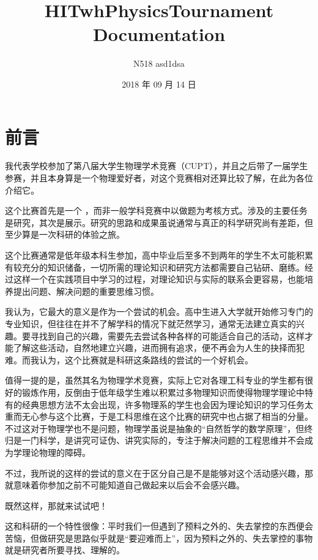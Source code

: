 \documentclass[a4paper,10pt,english]{sphinxmanual}
\title{HITwhPhysicsTournament Documentation}
\date{2018 年 09 月 14 日}
\author{N518 asd1dsa}
\begin{document}
\maketitle
\sphinxtableofcontents
{}\label{\detokenize{index::doc}}



\chapter{前言}
\label{\detokenize{Preface::doc}}\label{\detokenize{Preface:id1}}
我代表学校参加了第八届大学生物理学术竞赛（CUPT），并且之后带了一届学生参赛，并且本身算是一个物理爱好者，对这个竞赛相对还算比较了解，在此为各位介绍它。

这个比赛首先是一个  ，而非一般学科竞赛中以做题为考核方式。涉及的主要任务是研究，其次是展示。研究的思路和成果虽说通常与真正的科学研究尚有差距，但至少算是一次科研的体验之旅。

这个比赛通常是低年级本科生参加，高中毕业后至多不到两年的学生不太可能积累有较充分的知识储备，一切所需的理论知识和研究方法都需要自己钻研、磨练。经过这样一个在实践项目中学习的过程，对理论知识与实际的联系会更容易，也能培养提出问题、解决问题的重要思维习惯。

我认为，它最大的意义是作为一个尝试的机会。高中生进入大学就开始修习专门的专业知识，但往往在并不了解学科的情况下就茫然学习，通常无法建立真实的兴趣。要寻找到自己的兴趣，需要先去尝试各种各样的可能适合自己的活动，这样才能了解这些活动，自然地建立兴趣，进而拥有追求，便不再会为人生的抉择而犯难。而我认为，这个比赛就是科研这条路线的尝试的一个好机会。

值得一提的是，虽然其名为物理学术竞赛，实际上它对各理工科专业的学生都有很好的锻炼作用，反倒由于低年级学生难以积累过多物理知识而使得物理学理论中特有的经典思想方法不太会出现，许多物理系的学生也会因为理论知识的学习任务太重而无心参与这个比赛，于是工科思维在这个比赛的研究中也占据了相当的分量。不过这对于物理学也不是问题，物理学虽说是抽象的“自然哲学的数学原理”，但终归是一门科学，是讲究可证伪、讲究实际的，专注于解决问题的工程思维并不会成为学理论物理的障碍。

不过，我所说的这样的尝试的意义在于区分自己是不是能够对这个活动感兴趣，那就意味着你参加之前不可能知道自己做起来以后会不会感兴趣。

既然这样，那就来试试吧！

这和科研的一个特性很像：平时我们一但遇到了预料之外的、失去掌控的东西便会苦恼，但做研究是思路似乎就是“要迎难而上”，因为预料之外的、失去掌控的事物就是研究者所要寻找、理解的。
\end{document}
